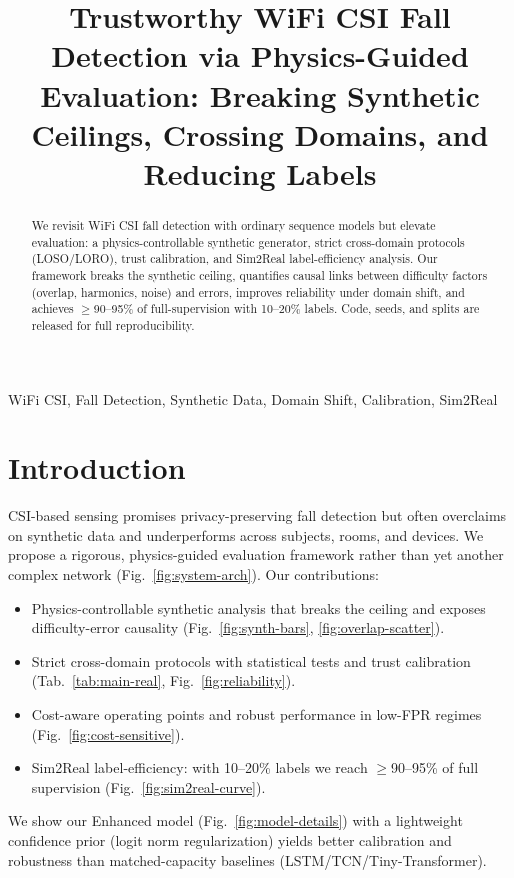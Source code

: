 \documentclass[10pt,conference]{IEEEtran}
\begin{document}
\title{Trustworthy WiFi CSI Fall Detection via Physics-Guided Evaluation: Breaking Synthetic Ceilings, Crossing Domains, and Reducing Labels}

\author{
}

\maketitle

\begin{abstract}
We revisit WiFi CSI fall detection with ordinary sequence models but elevate evaluation: a physics-controllable synthetic generator, strict cross-domain protocols (LOSO/LORO), trust calibration, and Sim2Real label-efficiency analysis. Our framework breaks the synthetic ceiling, quantifies causal links between difficulty factors (overlap, harmonics, noise) and errors, improves reliability under domain shift, and achieves $\geq$90--95\% of full-supervision with 10--20\% labels. Code, seeds, and splits are released for full reproducibility.
\end{abstract}

\begin{IEEEkeywords}
WiFi CSI, Fall Detection, Synthetic Data, Domain Shift, Calibration, Sim2Real
\end{IEEEkeywords}

\section{Introduction}
CSI-based sensing promises privacy-preserving fall detection but often overclaims on synthetic data and underperforms across subjects, rooms, and devices. We propose a rigorous, physics-guided evaluation framework rather than yet another complex network (Fig.~\ref{fig:system-arch}). Our contributions:
\begin{itemize}
  \item Physics-controllable synthetic analysis that breaks the ceiling and exposes difficulty-error causality (Fig.~\ref{fig:synth-bars}, \ref{fig:overlap-scatter}).
  \item Strict cross-domain protocols with statistical tests and trust calibration (Tab.~\ref{tab:main-real}, Fig.~\ref{fig:reliability}).
  \item Cost-aware operating points and robust performance in low-FPR regimes (Fig.~\ref{fig:cost-sensitive}).
  \item Sim2Real label-efficiency: with 10--20\% labels we reach $\geq$90--95\% of full supervision (Fig.~\ref{fig:sim2real-curve}).
\end{itemize}
We show our Enhanced model (Fig.~\ref{fig:model-details}) with a lightweight confidence prior (logit norm regularization) yields better calibration and robustness than matched-capacity baselines (LSTM/TCN/Tiny-Transformer).
\end{document}
